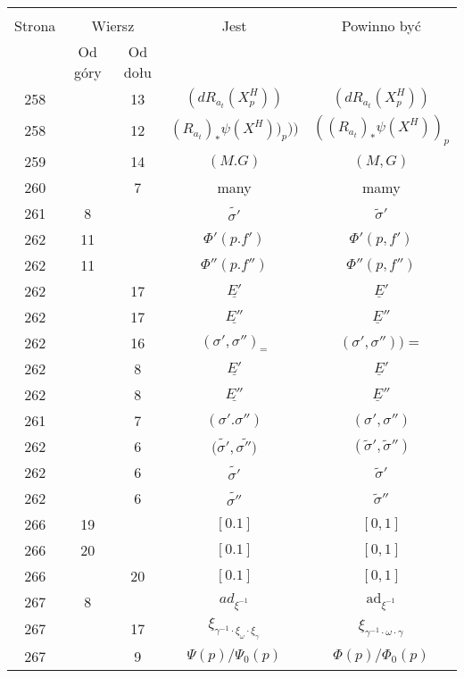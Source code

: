 \documentclass[a4paper,11pt]{article}
\newcommand{\mr}{\mathrm}
\newcommand{\ul}{\underline}
\newcommand{\ad}{\mr{ad}}
\newcommand{\ga}{\gamma}
\newcommand{\om}{\omega}
\newcommand{\s}{\sigma}
\newcommand{\wt}{\widetilde}
\begin{document}
\begin{center}
  \begin{tabular}{|c|c|c|c|c|}
    \hline
    & \multicolumn{2}{c|}{} & & \\
    Strona & \multicolumn{2}{c|}{Wiersz}& Jest & Powinno być \\ \cline{2-3}
    & Od góry & Od dołu &  &  \\ \hline
    258 & & 13 & $( dR_{ a_{ t } }( X_{ p }^{ H } ) )$
           & $( dR_{ a_{ t } }( X_{ p }^{ H } ) )$ \\
    258 & & 12 & $( R_{ a_{ t } } )_{ * } \psi( X^{ H } ) )_{ p } ) )$
           & $( ( R_{ a_{ t } } )_{ * } \psi( X^{ H } ) )_{ p }$ \\
    259 & & 14 & $( M. G )$ & $( M, G )$ \\
    260 & & 7 & many & mamy \\
    261 & 8 & & $\wt{ \s' }$ & $\wt{ \s }'$ \\
    262 & 11 & & $\Phi'( p. f' )$ & $\Phi'( p, f' )$ \\
    262 & 11 & & $\Phi''( p. f'' )$ & $\Phi''( p, f'' )$ \\
    262 & & 17 & $\ul{ E' }$ & $\ul{ E }'$ \\
    262 & & 17 & $\ul{ E'' }$ & $\ul{ E }''$ \\
    262 & & 16 & $( \s', \s'' )_{ = }$
           & $( \s', \s'' ) ) =$ \\
    262 & & 8 & $\ul{ E' }$ & $\ul{ E }'$ \\
    262 & & 8 & $\ul{ E'' }$ & $\ul{ E }''$ \\
    261 & & 7 & $( \s'. \s'' )$ & $( \s', \s'' )$ \\
    262 & & 6 & $( \wt{ \s' }, \wt{ \s'' ) }$
           & $( \wt{ \s }', \wt{ \s }'' )$ \\
    262 & & 6 & $\wt{ \s' }$ & $\wt{ \s }'$ \\
    262 & & 6 & $\wt{ \s'' }$ & $\wt{ \s }''$ \\
    266 & 19 & & $[ 0. 1 ]$ & $[ 0, 1 ]$ \\
    266 & 20 & & $[ 0. 1 ]$ & $[ 0, 1 ]$ \\
    266 & & 20 & $[ 0. 1 ]$ & $[ 0, 1 ]$ \\
    267 & 8 & & $ad_{ \xi^{ -1 } }$ & $\ad_{ \xi^{ -1 } }$ \\
    267 & & 17 & $\xi_{ \ga^{ - 1 } \cdot \xi_{ \om } \cdot \xi_{ \ga } }$
           & $\xi_{ \ga^{ - 1 } \cdot \om \cdot \ga }$ \\
    267 & & 9 & $\Psi( p ) / \Psi_{ 0 }( p )$ & $\Phi( p ) /
                                                \Phi_{ 0 }( p )$ \\

\end{tabular}
\end{center}
\end{document}
